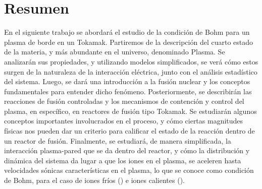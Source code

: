 \documentclass[a4paper,oneside,openright,12pt]{book}
\begin{document}

\chapter*{Resumen} %
En el siguiente trabajo se abordará el estudio de la condición de Bohm para un plasma de borde en un Tokamak. Partiremos de la descripción del cuarto estado de la materia, y más abundante en el universo, denominado Plasma. Se analizarán sus propiedades, y utilizando modelos simplificados, se verá cómo estos surgen de la naturaleza de la interacción eléctrica, junto con el análisis estadístico del sistema. Luego, se dará una introducción a la fusión nuclear y los conceptos fundamentales para entender dicho fenómeno. Posteriormente, se describirán las reacciones de fusión controladas y los mecanismos de contención y control del plasma, en específico, en reactores de fusión tipo Tokamak. Se estudiarán algunos conceptos importantes involucrados en el proceso, y cómo ciertas magnitudes físicas nos pueden dar un criterio para calificar el estado de la reacción dentro de un reactor de fusión. Finalmente, se estudiará, de manera simplificada, la interacción plasma-pared que se da dentro del reactor, y cómo la distribución y dinámica del sistema da lugar a que los iones en el plasma, se aceleren hasta velocidades sónicas características en el plasma, lo que se conoce como condición de Bohm, para el caso de iones fríos () e iones calientes ().


\tableofcontents %
\setcounter{secnumdepth}{3} %

\end{document}
